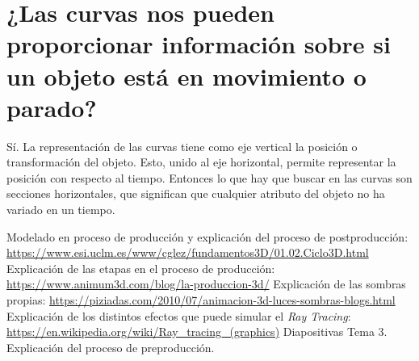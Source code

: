 \documentclass{article}
\begin{document}
\section{¿Las curvas nos pueden proporcionar información sobre si un objeto está en movimiento o parado?}


Sí. La representación de las curvas tiene como eje vertical la posición o transformación del objeto. Esto, unido al eje horizontal, permite representar la posición con respecto al tiempo. Entonces lo que hay que buscar en las curvas son secciones horizontales, que significan que cualquier atributo del objeto no ha variado en un tiempo.

\begin{thebibliography}{1}
     Modelado en proceso de producción y explicación del proceso de postproducción: \url{https://www.esi.uclm.es/www/cglez/fundamentos3D/01.02.Ciclo3D.html}
     Explicación de las etapas en el proceso de producción: \url{https://www.animum3d.com/blog/la-produccion-3d/}
     Explicación de las sombras propias: \url{https://piziadas.com/2010/07/animacion-3d-luces-sombras-blogs.html}
     Explicación de los distintos efectos que puede simular el \textit{Ray Tracing}: \url{https://en.wikipedia.org/wiki/Ray_tracing_(graphics)}
     Diapositivas Tema 3. Explicación del proceso de preproducción.
\end{thebibliography}
\end{document}
